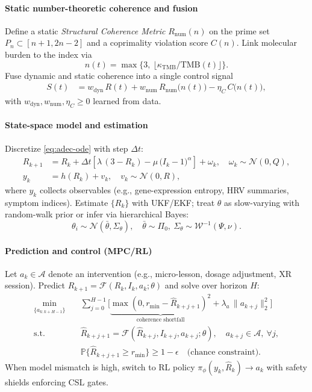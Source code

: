 \documentclass[11pt]{article}
\theoremstyle{plain}
\begin{document}
\paragraph{Static number-theoretic coherence and fusion}
Define a static \emph{Structural Coherence Metric} $R_{\mathrm{num}}(n)$ on the prime set $P_n \subset [n+1,2n-2]$ and a coprimality violation score $C(n)$. Link molecular burden to the index via
\[
n(t) = \max\{3,\ \lfloor \kappa_{\mathrm{TMB}}/\mathrm{TMB}(t)\rfloor\}.
\]
Fuse dynamic and static coherence into a single control signal
\begin{align}
S(t) &= w_{\mathrm{dyn}}\,R(t) + w_{\mathrm{num}}\,R_{\mathrm{num}}\!\big(n(t)\big) - \eta_C\,C\!\big(n(t)\big),
\label{eq:fusedS}
\end{align}
with $w_{\mathrm{dyn}},w_{\mathrm{num}},\eta_C \ge 0$ learned from data.

\paragraph{State-space model and estimation}
Discretize \eqref{eq:adec-ode} with step $\Delta t$:
\begin{align}
R_{k+1} &= R_k + \Delta t\left[\lambda\,(3-R_k) - \mu\,\big(I_k-1\big)^{\alpha}\right] + \omega_k,\quad \omega_k\sim\mathcal{N}(0,Q), \\
y_k &= h(R_k) + v_k,\quad v_k\sim\mathcal{N}(0,R),
\end{align}
where $y_k$ collects observables (e.g., gene-expression entropy, HRV summaries, symptom indices). Estimate $\{R_k\}$ with UKF/EKF; treat $\theta$ as slow-varying with random-walk prior or infer via hierarchical Bayes:
\[
\theta_i \sim \mathcal{N}(\bar{\theta},\Sigma_\theta), \quad \bar{\theta}\sim \Pi_0,\ \Sigma_\theta\sim \mathcal{W}^{-1}(\Psi,\nu).
\]

\paragraph{Prediction and control (MPC/RL)}
Let $a_k\in\mathcal{A}$ denote an intervention (e.g., micro-lesson, dosage adjustment, XR session). Predict $R_{k+1}=\mathcal{F}(R_k,I_k,a_k;\theta)$ and solve over horizon $H$:
\begin{align}
\min_{\{a_{k:k+H-1}\}} \quad & \sum_{j=0}^{H-1}\Big[\underbrace{\max(0,r_{\min}-\hat{R}_{k+j+1})^2}_{\text{coherence shortfall}} + \lambda_a\,\|a_{k+j}\|_2^2\Big] \\
\text{s.t.}\quad & \hat{R}_{k+j+1}=\mathcal{F}(\hat{R}_{k+j},I_{k+j},a_{k+j};\hat{\theta}),\quad a_{k+j}\in\mathcal{A},\ \forall j, \\
& \mathbb{P}\{\hat{R}_{k+j+1} \ge r_{\min}\}\ge 1-\epsilon\quad\text{(chance constraint)}.
\end{align}
When model mismatch is high, switch to RL policy $\pi_\phi(y_k,\hat{R}_k)\to a_k$ with safety shields enforcing CSL gates.
\end{document}
